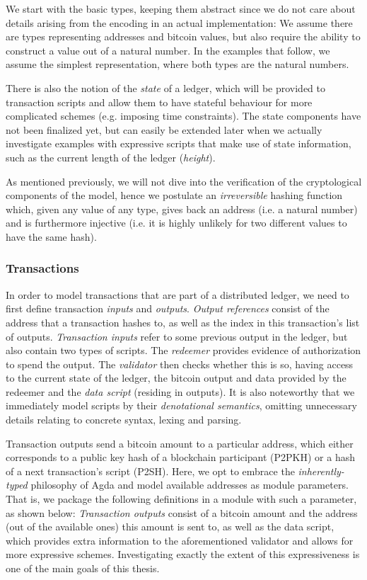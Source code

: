 \documentclass[acmsmall,nonacm=true,screen=true]{acmart}
\begin{document}
We start with the basic types, keeping them abstract since we do not care about details arising from the encoding in an
actual implementation:
\UTXObasicTypes{}
We assume there are types representing addresses and bitcoin values, but also require the ability to construct
a value out of a natural number. In the examples that follow, we assume the simplest representation, where
both types are the natural numbers.

There is also the notion of the \textit{state} of a ledger, which will be provided to transaction scripts and allow
them to have stateful behaviour for more complicated schemes (e.g. imposing time constraints).
\UTXOstate{}
The state components have not been finalized yet, but can easily be extended later when we actually investigate
examples with expressive scripts that make use of state information, such as the current length of the ledger (\textit{height}).

As mentioned previously, we will not dive into the verification of the cryptological components of the model,
hence we postulate an \textit{irreversible} hashing function which, given any value of any type,
gives back an address (i.e. a natural number) and is furthermore injective (i.e. it is highly unlikely for two different
values to have the same hash).
\UTXOhash{}

\subsubsection{Transactions}
In order to model transactions that are part of a distributed ledger, we need to first define
transaction \textit{inputs} and \textit{outputs}.
\UTXOinsOutRefs{}
\textit{Output references} consist of the address that a transaction hashes to, 
as well as the index in this transaction's list of outputs.
\textit{Transaction inputs} refer to some previous output in the ledger, but also contain two types of scripts.
The \textit{redeemer} provides evidence of authorization to spend the output.
The \textit{validator} then checks whether this is so, having access to the current state of the ledger, the bitcoin output
and data provided by the redeemer and the \textit{data script} (residing in outputs).
It is also noteworthy that we immediately model scripts by their \textit{denotational semantics},
omitting unnecessary details relating to concrete syntax, lexing and parsing.

Transaction outputs send a bitcoin amount to a particular address, which either corresponds to a public key hash of a
blockchain participant (P2PKH) or a hash of a next transaction's script (P2SH).
Here, we opt to embrace the \textit{inherently-typed} philosophy of Agda and model available addresses as module parameters.
That is, we package the following definitions in a module with such a parameter, as shown below:
\UTXOoutTxA{}
\UTXOoutTxB{}
\textit{Transaction outputs} consist of a bitcoin amount and the address (out of the available ones) this amount is sent to,
as well as the data script, which provides extra information to the aforementioned validator and allows for more expressive schemes.
Investigating exactly the extent of this expressiveness is one of the main goals of this thesis.
\end{document}
